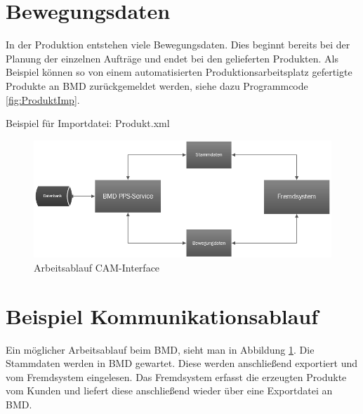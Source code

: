 \section{Bewegungsdaten}
In der Produktion entstehen viele Bewegungsdaten. Dies beginnt bereits bei der Planung der einzelnen Aufträge und endet bei den gelieferten Produkten. Als Beispiel können so von einem automatisierten Produktionsarbeitsplatz gefertigte Produkte an BMD zurückgemeldet werden, siehe dazu Programmcode \ref{fig:ProduktImp}. 

\begin{program}
\centering
{}
    
\caption{Beispiel für Importdatei: Produkt.xml
}
\label{fig:ProduktImp}
\end{program}

\begin{figure}
    \centering
    \includegraphics[width=.95\textwidth]{images/Systemschema_black.png}
    \caption{Arbeitsablauf CAM-Interface}
    \label{fig:Arbeitsablauf}
\end{figure}

\section{Beispiel Kommunikationsablauf}
Ein möglicher Arbeitsablauf beim BMD, sieht man in Abbildung \ref{fig:Arbeitsablauf}. Die Stammdaten werden in BMD gewartet. Diese werden anschließend exportiert und vom Fremdsystem eingelesen. Das Fremdsystem erfasst die erzeugten Produkte vom Kunden und liefert diese anschließend wieder über eine Exportdatei an BMD. 